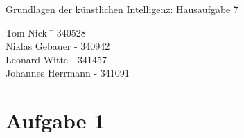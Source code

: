 \documentclass[a4paper,10pt]{article}
\begin{document}
\begin{center}
\Large{Grundlagen der künstlichen Intelligenz: Hausaufgabe 7} \\
\end{center}
\begin{tabbing}
Tom Nick \hspace{2cm}\= - 340528\\
Niklas Gebauer \> - 340942 \\
Leonard Witte \> - 341457 \\
Johannes Herrmann \> - 341091\\
\end{tabbing}

\section*{Aufgabe 1}
\end{document}
